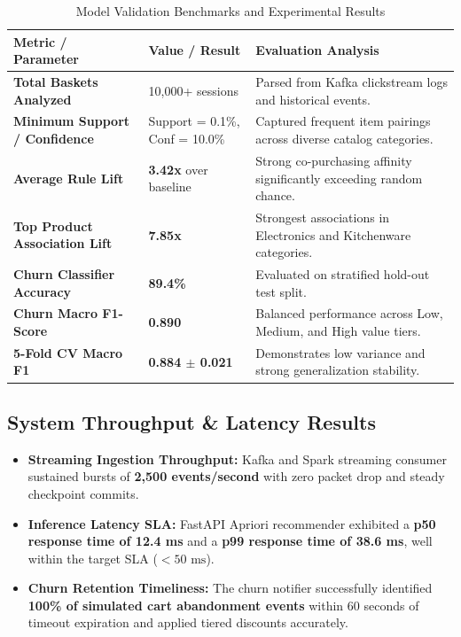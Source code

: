 \documentclass[11pt,a4paper]{article}
\begin{document}
\begin{table}[h]
\centering
\small
\begin{tabularx}{\textwidth}{@{}>{\bfseries}p{5.5cm}p{3.5cm}X@{}}
\toprule
\color{DeepNavy}Metric / Parameter & \color{DeepNavy}Value / Result & \color{DeepNavy}Evaluation Analysis \\
\midrule
Total Baskets Analyzed & 10,000+ sessions & Parsed from Kafka clickstream logs and historical events. \\
Minimum Support / Confidence & Support = 0.1\%, Conf = 10.0\% & Captured frequent item pairings across diverse catalog categories. \\
Average Rule Lift & \textbf{3.42x} over baseline & Strong co-purchasing affinity significantly exceeding random chance. \\
Top Product Association Lift & \textbf{7.85x} & Strongest associations in Electronics and Kitchenware categories. \\
Churn Classifier Accuracy & \textbf{89.4\%} & Evaluated on stratified hold-out test split. \\
Churn Macro F1-Score & \textbf{0.890} & Balanced performance across Low, Medium, and High value tiers. \\
5-Fold CV Macro F1 & \textbf{0.884 $\pm$ 0.021} & Demonstrates low variance and strong generalization stability. \\
\bottomrule
\end{tabularx}
\caption{Model Validation Benchmarks and Experimental Results}
\end{table}

\subsection{System Throughput \& Latency Results}
\begin{itemize}
    \item \textbf{Streaming Ingestion Throughput:} Kafka and Spark streaming consumer sustained bursts of \textbf{2,500 events/second} with zero packet drop and steady checkpoint commits.
    \item \textbf{Inference Latency SLA:} FastAPI Apriori recommender exhibited a \textbf{p50 response time of 12.4 ms} and a \textbf{p99 response time of 38.6 ms}, well within the target SLA ($<50\text{ ms}$).
    \item \textbf{Churn Retention Timeliness:} The churn notifier successfully identified \textbf{100\% of simulated cart abandonment events} within 60 seconds of timeout expiration and applied tiered discounts accurately.
\end{itemize}
\end{document}
